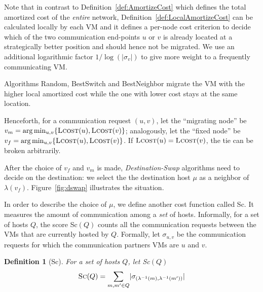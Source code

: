 \documentclass[conference]{IEEEtran}
\newtheorem{definition}{Definition}
\def\abs#1{\lvert #1 \rvert}
\newcommand{\LCost}{\text{\sc Lcost}}
\begin{document}
Note that in contrast to Definition~\ref{def:AmortizeCost} which defines the total amortized cost of the \emph{entire} network,
 Definition~\ref{def:LocalAmortizeCost} can be calculated locally by each VM and it defines a per-node cost criterion to decide which of the two communication end-points $u$ or $v$ is already located at a strategically better position and should hence not be migrated.
We use an additional logarithmic factor $1/\log (|\sigma_{v}|)$ to give more weight to a frequently communicating VM.



Algorithms {\sc Random}, {\sc BestSwitch} and {\sc BestNeighbor} migrate the VM with the higher local amortized cost while the one with lower cost stays at the same location.






Henceforth, for a communication request $(u,v)$, let the ``migrating node''  be $v_m = \arg\min_{u,v} \{ \LCost(u),\LCost(v)\}$;
analogously, let the ``fixed node'' be $v_f= \arg\min_{u,v} \{ \LCost(u),\LCost(v)\}$. If $\LCost(u)=\LCost(v)$, the tie can be broken arbitrarily.

After the choice of $v_f$ and $v_m$ is made, \emph{Destination-Swap} algorithms need to decide
on the destination: we select the the destination host $\mu$ as a neighbor of $\lambda(v_f)$. Figure~\ref{fig:dswap} illustrates the situation.


In order to describe the choice of $\mu$, we define another cost function called {\sc Sc}. It measures the amount of communication among a \emph{set} of hosts.
Informally, for a set of hosts $Q$, the score {\sc Sc}$(Q)$ counts all the communication requests between the VMs that are currently hosted by $Q$. Formally,
let $\sigma_{u,v}$ be the communication requests for which the communication partners VMs are $u$ and $v$.
\begin{definition}[{\sc Sc}]\label{def:scoreServers}
For a set of hosts $Q$, let {\sc Sc}$(Q)$
\begin {align}
\text{\sc Sc}(Q) =  \sum_{m, m' \in Q} \abs{\sigma_{(\lambda^{-1}(m), \lambda^{-1}(m'))}}
\end {align}
\end{definition}
\end{document}
